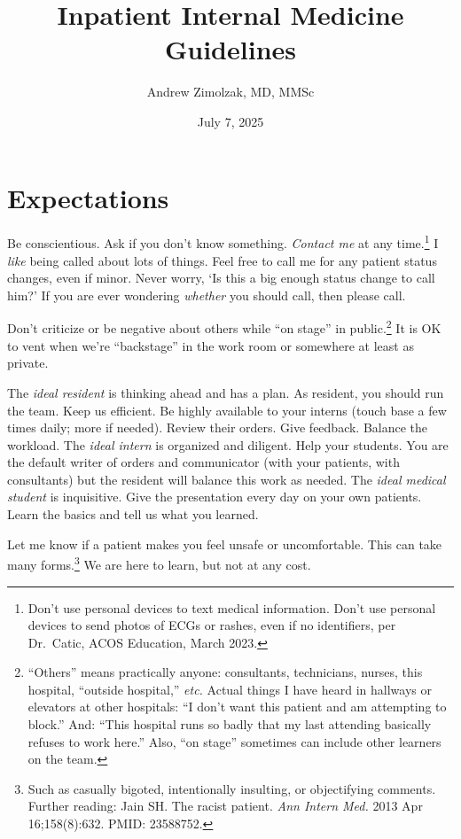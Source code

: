 \documentclass{tufte-handout}
\title{Inpatient Internal Medicine Guidelines}
\author{Andrew Zimolzak, MD, MMSc}
\date{July 7, 2025}
\begin{document}
\maketitle

\section{Expectations}

Be conscientious. Ask if you don't know something. \emph{Contact me}
at any time.\footnote{Don't use personal devices to text medical
information. Don't use personal devices to send photos of ECGs or
rashes, even if no identifiers, per Dr.\ Catic, ACOS Education, March
2023.} I \emph{like} being called about lots of things. Feel free to
call me for any patient status changes, even if minor. Never worry,
`Is this a big enough status change to call him?' If you are ever
wondering \emph{whether} you should call, then please call.

Don't criticize or be negative about others while ``on stage'' in
public.\footnote{``Others'' means
practically anyone: consultants, technicians, nurses, this hospital,
``outside hospital,'' \emph{etc.} Actual things I have heard in
hallways or elevators at other hospitals: ``I don't want this patient and am
attempting to block.'' And: ``This hospital runs so badly that my last
attending basically refuses to work here.'' Also, ``on stage''
sometimes can include other learners on the team.} It is
OK to vent when we're ``backstage'' in the work room or somewhere at
least as private.

The \emph{ideal resident} is thinking ahead and has a plan. As
resident, you should run the team. Keep us efficient. Be highly
available to your interns (touch base a few times daily; more if
needed). Review their orders. Give feedback. Balance the workload. The
\emph{ideal intern} is organized and diligent. Help your students. You
are the default writer of orders and communicator (with your patients,
with consultants) but the resident will balance this work as needed.
The \emph{ideal medical student} is inquisitive. Give the presentation
every day on your own patients. Learn the basics and tell us what you
learned.

Let me know if a patient makes you feel unsafe or uncomfortable. This
can take many forms.\footnote{Such as casually bigoted, intentionally
insulting, or objectifying comments. Further reading: Jain SH. The
racist patient. \emph{Ann Intern Med.} 2013 Apr 16;158(8):632. PMID:
23588752.} We are here to learn, but not at any cost.
\end{document}
